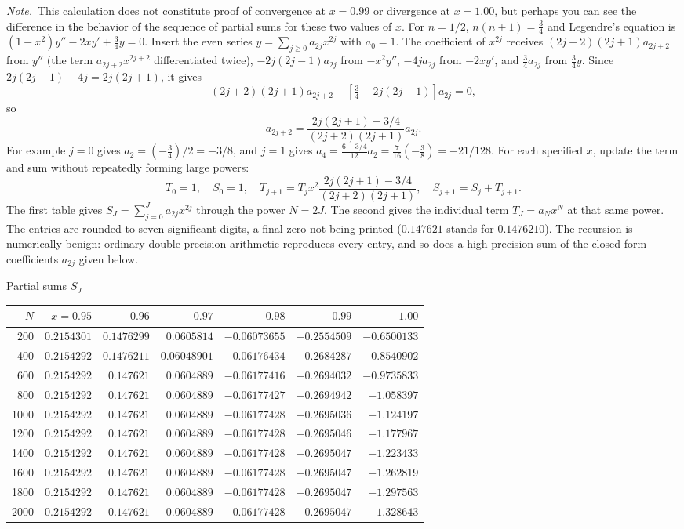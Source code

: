 \emph{Note.}~This calculation does not constitute proof of convergence at
$x=0.99$ or divergence at $x=1.00$, but perhaps you can see the difference in
the behavior of the sequence of partial sums for these two values of $x$.
\solution
For $n=1/2$, $n(n+1)=\frac34$ and Legendre's equation is
$(1-x^2)y''-2xy'+\tfrac34y=0$.
Insert the even series $y=\sum_{j\ge0}a_{2j}x^{2j}$ with $a_0=1$.
The coefficient of $x^{2j}$ receives $(2j+2)(2j+1)a_{2j+2}$ from $y''$
(the term $a_{2j+2}x^{2j+2}$ differentiated twice), $-2j(2j-1)a_{2j}$
from $-x^2y''$, $-4ja_{2j}$ from $-2xy'$, and $\frac34a_{2j}$ from
$\frac34y$. Since $2j(2j-1)+4j=2j(2j+1)$, it gives
\[
(2j+2)(2j+1)a_{2j+2}
+[\tfrac34-2j(2j+1)]a_{2j}=0,
\]
so
\[
\boxed{a_{2j+2}=
\frac{2j(2j+1)-3/4}{(2j+2)(2j+1)}a_{2j}}.
\]
For example $j=0$ gives $a_2=(-\frac34)/2=-3/8$, and $j=1$ gives
$a_4=\frac{6-3/4}{12}a_2=\frac7{16}\left(-\frac38\right)=-21/128$.
For each specified $x$, update the term and sum without repeatedly
forming large powers:
\[
T_0=1,\quad S_0=1,\quad
T_{j+1}=T_jx^2\frac{2j(2j+1)-3/4}{(2j+2)(2j+1)},\quad
S_{j+1}=S_j+T_{j+1}.
\]
The first table gives $S_J=\sum_{j=0}^Ja_{2j}x^{2j}$ through the power
$N=2J$. The second gives the individual term $T_J=a_Nx^N$ at that
same power. The entries are rounded to seven significant digits, a
final zero not being printed ($0.147621$ stands for $0.1476210$). The
recursion is numerically benign: ordinary double-precision arithmetic
reproduces every entry, and so does a high-precision sum of the
closed-form coefficients $a_{2j}$ given below.

\begin{center}\scriptsize
Partial sums $S_J$\par\smallskip
\setlength{\tabcolsep}{2.7pt}
\begin{tabular}{r*{6}{r}}\toprule
$N$&$x=0.95$&$0.96$&$0.97$&$0.98$&$0.99$&$1.00$\\\midrule
200&$0.2154301$&$0.1476299$&$0.0605814$&$-0.06073655$&$-0.2554509$&$-0.6500133$\\
400&$0.2154292$&$0.1476211$&$0.06048901$&$-0.06176434$&$-0.2684287$&$-0.8540902$\\
600&$0.2154292$&$0.147621$&$0.0604889$&$-0.06177416$&$-0.2694032$&$-0.9735833$\\
800&$0.2154292$&$0.147621$&$0.0604889$&$-0.06177427$&$-0.2694942$&$-1.058397$\\
1000&$0.2154292$&$0.147621$&$0.0604889$&$-0.06177428$&$-0.2695036$&$-1.124197$\\
1200&$0.2154292$&$0.147621$&$0.0604889$&$-0.06177428$&$-0.2695046$&$-1.177967$\\
1400&$0.2154292$&$0.147621$&$0.0604889$&$-0.06177428$&$-0.2695047$&$-1.223433$\\
1600&$0.2154292$&$0.147621$&$0.0604889$&$-0.06177428$&$-0.2695047$&$-1.262819$\\
1800&$0.2154292$&$0.147621$&$0.0604889$&$-0.06177428$&$-0.2695047$&$-1.297563$\\
2000&$0.2154292$&$0.147621$&$0.0604889$&$-0.06177428$&$-0.2695047$&$-1.328643$\\
\bottomrule\end{tabular}\end{center}


